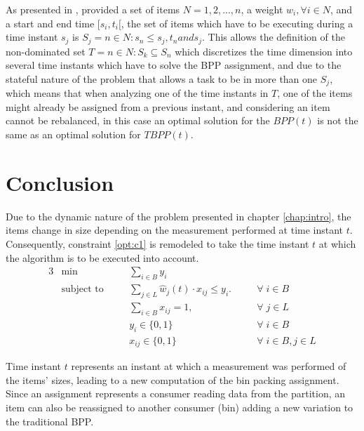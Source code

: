 As presented in \cite{furini2018matheuristics}, provided a set of items $N =
{1,2,...,n}$, a weight $w_i, \forall i \in N$, and a start and end time $[s_i,
t_i[$, the set of items which have to be executing during a time instant $s_j$
is $S_j = {n \in N: s_n \leq s_j, t_n and s_j}$. This allows the definition of
the non-dominated set $T = {n \in N: S_k \subseteq S_n}$ which discretizes the
time dimension into several time instants which have to solve the BPP
assignment, and due to the stateful nature of the problem that allows a task to
be in more than one $S_j$, which means that when analyzing one of the time
instants in $T$, one of the items might already be assigned from a previous
instant, and considering an item cannot be rebalanced, in this case an optimal
solution for the $BPP(t)$ is not the same as an optimal solution for $TBPP(t)$.

\section{Conclusion}

Due to the dynamic nature of the problem presented in chapter \ref{chap:intro},
the items change in size depending on the measurement performed at time instant
$t$. Consequently, constraint \ref{opt:c1} is remodeled to take the time instant
$t$ at which the algorithm is to be executed into account.
\begin{alignat}{3}
\label{BPP model}
    &\min       
        &&\sum_{i \in B} y_i 
            && \\
    &\text{subject to} \quad
        && \sum_{j \in L} \hat w_j(t) \cdot x_{ij} \leq y_i. \quad      
            && \forall \; i \in B \\
    &   && \sum_{i \in B} x_{ij} = 1, \quad                             
            && \forall \; j \in L \\
    &   && y_i \in \{0, 1\}                                             
            && \forall \; i \in B \\
    &   && x_{ij} \in \{0,1\}                                           
            && \forall \; i \in B, j \in L
\end{alignat}

Time instant $t$ represents an instant at which a measurement was performed
of the items' sizes, leading to a new computation of the bin packing assignment.
Since an assignment represents a consumer reading data from the partition, an
item can also be reassigned to another consumer (bin) adding a new variation to the
traditional BPP. 

